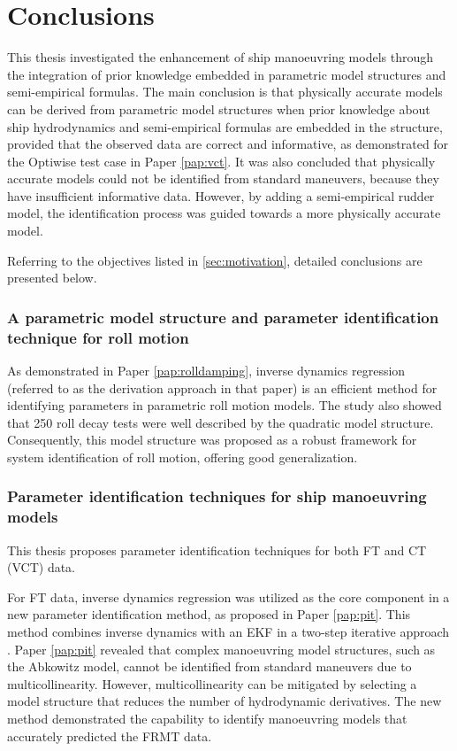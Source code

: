 \chapter{Conclusions\label{ch:conclusions}}

\noindent This thesis investigated the enhancement of ship manoeuvring models through the
integration of prior knowledge embedded in parametric model structures and semi-empirical
formulas. The main conclusion is that physically accurate models
can be derived from parametric model structures when prior knowledge about ship
hydrodynamics and semi-empirical formulas are embedded in the structure, provided
that the observed data are correct and informative, as demonstrated for the Optiwise test case in Paper \ref{pap:vct}.
It was also concluded that physically accurate models could not be identified from standard maneuvers, because they have insufficient informative data. However, by adding a semi-empirical rudder model, the identification process was guided towards a more physically accurate model.

Referring to the objectives listed in \autoref{sec:motivation}, detailed conclusions are presented below.

\subsection*{A parametric model structure and parameter identification technique for roll motion}
As demonstrated in Paper \ref{pap:rolldamping}, inverse dynamics regression (referred to as the derivation approach in that paper) is an efficient method for identifying parameters in parametric roll motion models. The study also showed that 250 roll decay tests were well described by the quadratic model structure. Consequently, this model structure was proposed as a robust framework for system identification of roll motion, offering good generalization.

\subsection*{Parameter identification techniques for ship manoeuvring models}
This thesis proposes parameter identification techniques for both FT and CT (VCT) data.

For FT data, inverse dynamics regression was utilized as the core component in a new parameter identification method, as proposed in Paper \ref{pap:pit}. This method combines inverse dynamics with an EKF in a two-step iterative approach \cite{yoonIdentificationHydrodynamicCoefficients2003}. Paper \ref{pap:pit} revealed that complex manoeuvring model structures, such as the Abkowitz model, cannot be identified from standard maneuvers due to multicollinearity. However, multicollinearity can be mitigated by selecting a model structure that reduces the number of hydrodynamic derivatives. The new method demonstrated the capability to identify manoeuvring models that accurately predicted the FRMT data.

